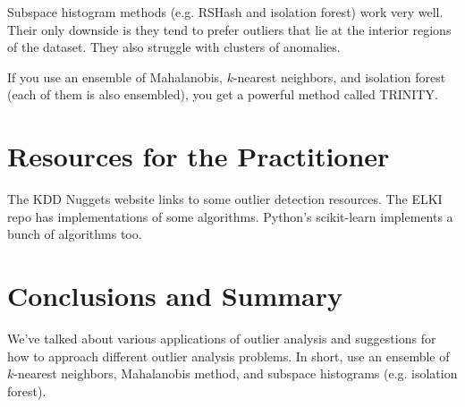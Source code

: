 \documentclass[a4paper]{article}
\begin{document}
Subspace histogram methods (e.g. RSHash and isolation forest) work very well.
Their only downside is they tend to prefer outliers that lie at the interior
regions of the dataset. They also struggle with clusters of anomalies.


If you use an ensemble of Mahalanobis, $k$-nearest neighbors, and isolation
forest (each of them is also ensembled), you get a powerful method called
TRINITY.

\section{Resources for the Practitioner}
The KDD Nuggets website links to some outlier detection resources. The ELKI
repo has implementations of some algorithms. Python's scikit-learn implements
a bunch of algorithms too.

\section{Conclusions and Summary}
We've talked about various applications of outlier analysis and suggestions for
how to approach different outlier analysis problems. In short, use an ensemble
of $k$-nearest neighbors, Mahalanobis method, and subspace histograms (e.g.
isolation forest).
\end{document}

